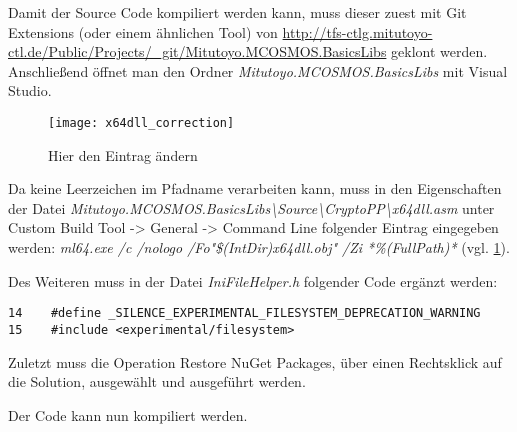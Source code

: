 Damit der Source Code kompiliert werden kann, muss dieser zuest mit Git Extensions (oder einem ähnlichen Tool) von
\url{http://tfs-ctlg.mitutoyo-ctl.de/Public/Projects/_git/Mitutoyo.MCOSMOS.BasicsLibs} geklont werden. \newline
Anschließend öffnet man den Ordner \textit{Mitutoyo.MCOSMOS.BasicsLibs} mit Visual Studio.

\begin{figure}[htpb]
    \centering
    \texttt{[image: x64dll\_correction]}
    \caption{Hier den Eintrag ändern}
    \label{img:x64dll_correction}
\end{figure}

Da  keine Leerzeichen im Pfadname verarbeiten kann, muss in den Eigenschaften der Datei
\textit{Mitutoyo.MCOSMOS.BasicsLibs\textbackslash Source\textbackslash CryptoPP\textbackslash x64dll.asm} unter \glqq{}Custom Build Tool\grqq{}
-> \glqq{}General\grqq{} -> \glqq{}Command Line\grqq{} folgender Eintrag eingegeben werden: \textit{ml64.exe /c /nologo /Fo"\$(IntDir)x64dll.obj" /Zi *\%(FullPath)*}
(vgl. \ref{img:x64dll_correction}).

Des Weiteren muss in der Datei \textit{IniFileHelper.h} folgender Code ergänzt werden:
\begin{lstlisting}
14    #define _SILENCE_EXPERIMENTAL_FILESYSTEM_DEPRECATION_WARNING
15    #include <experimental/filesystem>
\end{lstlisting}

Zuletzt muss die Operation \glqq{}Restore NuGet Packages\grqq{}, über einen Rechtsklick auf die Solution, ausgewählt und ausgeführt werden.

Der Code kann nun kompiliert werden.